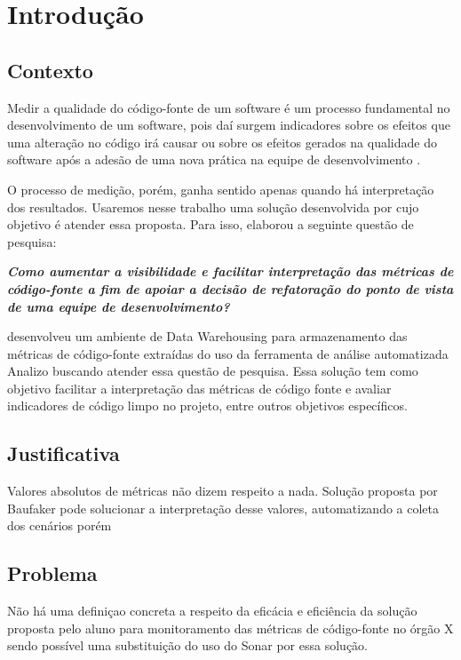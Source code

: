 \chapter{Introdução}

\section{Contexto}

Medir a qualidade do código-fonte  de um software é um processo fundamental no desenvolvimento de um software, pois daí surgem indicadores sobre os efeitos que uma alteração no código irá causar ou sobre os efeitos gerados na qualidade do software após a adesão de uma nova prática na equipe de desenvolvimento \cite{Fenton98}.

O processo de medição, porém, ganha sentido apenas quando há interpretação dos resultados. Usaremos nesse trabalho uma solução desenvolvida por  cujo objetivo é atender essa proposta. Para isso,  elaborou a seguinte questão de pesquisa: 

\textit{\textbf{Como aumentar a
visibilidade e facilitar interpretação das 
métricas de código-fonte
a fim de apoiar a decisão de refatoração
do ponto de vista de uma equipe de desenvolvimento?}}

 desenvolveu um ambiente de Data Warehousing para armazenamento das métricas de código-fonte extraídas do uso da ferramenta de análise  automatizada Analizo buscando atender essa questão de pesquisa. Essa solução tem como objetivo facilitar a interpretação das métricas de código fonte e avaliar indicadores de código limpo no projeto, entre outros objetivos específicos.

\section{Justificativa}

Valores absolutos de métricas não dizem respeito a nada. Solução proposta por Baufaker pode solucionar a interpretação desse valores, automatizando a coleta dos cenários porém


\section{Problema}

Não há uma definiçao concreta a respeito da eficácia e eficiência da solução proposta pelo aluno  para monitoramento das métricas de código-fonte no órgão X sendo possível uma substituição do uso do Sonar por essa solução.

